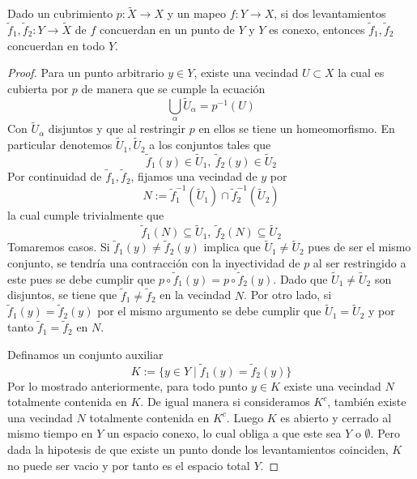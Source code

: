 \begin{teorema}\label{thm:uniq-general}
  Dado un cubrimiento \(p : \tilde X \to X\) y un mapeo \(f : Y \to X\),
  si dos levantamientos \(\tilde f _1 , \tilde f _2 : Y \to \tilde X\)
  de \(f\) concuerdan en un punto de \(Y\) y \(Y\) es conexo, entonces
  \(\tilde f _1 , \tilde f _2\) concuerdan en todo \(Y\).
\end{teorema}
\begin{proof}
  Para un punto arbitrario \(y \in Y\), existe una vecindad \(U \subset
  X\) la cual es cubierta por \(p\) de manera que se cumple la
  ecuación
  \[ \bigcup_{\alpha} \tilde U_\alpha = p^{-1} \left( U \right)\]
  Con \(\tilde U _\alpha\) disjuntos y que al restringir \(p\) en ellos
  se tiene un homeomorfismo. En particular denotemos \(\tilde U
  _1 , \tilde U _2\) a los conjuntos tales que
  \[ \tilde f _1 ( y ) \in \tilde U _1,\ \tilde f _2 ( y ) \in \tilde U
    _2 \]
  Por continuidad de \(\tilde f_1, \tilde f_2 \), fijamos una vecindad
  de \(y\) por
  \[ N := \tilde f _1 ^{-1} (\tilde U _1) \cap \tilde f _2 ^{-1} (\tilde
    U _2) \]
  la cual cumple trivialmente que
  \[ \tilde f_1 (N) \subseteq \tilde U _1,\ \tilde f_2 (N) \subseteq
    \tilde U _2 \]
  Tomaremos casos. Si \(\tilde f _1 (y) \neq \tilde f _2 (y)\) implica
  que \(\tilde U _1 \neq \tilde U _2\) pues de ser el mismo conjunto, se
  tendría una contracción con la inyectividad de \(p\) al ser
  restringido a este pues se debe cumplir que \( p \circ \tilde f _1 (y)
  = p \circ \tilde f _2 (y)\). Dado que \(\tilde U_1 \neq \tilde U _ 2\)
  son disjuntos, se tiene que \(\tilde f_1 \neq \tilde f_2 \) en la
  vecindad \(N\). Por otro lado, si \(\tilde f _1 (y) = \tilde f _2
  (y)\) por el mismo argumento se debe cumplir que \(\tilde U _1 = \tilde
  U _2\) y por tanto \(\tilde f _1 = \tilde f _2\) en \(N\).

  Definamos un conjunto auxiliar
  \[ K := \{ y \in Y \mid \tilde f_1 (y) = \tilde f_2 (y) \} \]
  Por lo mostrado anteriormente, para todo punto \(y \in K\) existe una
  vecindad \(N\) totalmente contenida en \(K\). De igual manera si
  consideramos \(K^c\), también existe una vecindad \(N\) totalmente
  contenida en \(K^c\). Luego \(K\) es abierto y cerrado al mismo tiempo
  en \(Y\) un espacio conexo, lo cual obliga a que este sea \(Y\) o
  \(\emptyset\). Pero dada la hipotesis de que existe un punto donde los
  levantamientos coinciden, \(K\) no puede ser vacio y por tanto es el
  espacio total \(Y\).
\end{proof}

